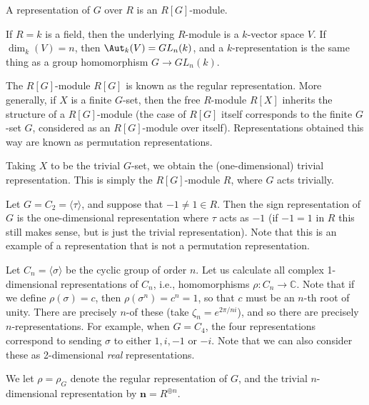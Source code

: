 \documentclass{willowtreebook}
\begin{document}
\begin{definition}
    A representation of $G$ over $R$ is an $R[G]$-module. 
\end{definition}
\begin{example}
    If $R = k$ is a field, then the underlying $R$-module is a $k$-vector space $V$. If $\dim_k(V) = n$, then $\Aut_k(V) = GL_n(k)$, and a $k$-representation is the same thing as a group homomorphism $G \to GL_n(k)$. 
\end{example}
\begin{definition}
    The $R[G]$-module $R[G]$ is known as the regular representation. More generally, if $X$ is a finite $G$-set, then the free $R$-module $R[X]$ inherits the structure of a $R[G]$-module (the case of $R[G]$ itself corresponds to the finite $G$-set $G$, considered as an $R[G]$-module over itself). Representations obtained this way are known as permutation representations. 
\end{definition}
\begin{example}
    Taking $X$ to be the trivial $G$-set, we obtain the (one-dimensional) trivial representation. This is simply the $R[G]$-module $R$, where $G$ acts trivially. 
\end{example}
\begin{definition}
    Let $G = C_2 = \langle \tau \rangle$, and suppose that $-1 \ne 1 \in R$. Then the sign representation of $G$ is the one-dimensional representation where $\tau$ acts as $-1$ (if $-1 = 1$ in $R$ this still makes sense, but is just the trivial representation). Note that this is an example of a representation that is not a permutation representation.
\end{definition}
\begin{example}
    Let $C_n = \langle \sigma \rangle$ be the cyclic group of order $n$. Let us calculate all complex 1-dimensional representations of $C_n$, i.e., homomorphisms $\rho \colon C_n \to \mathbb{C}$. Note that if we define $\rho(\sigma) =c$, then $\rho(\sigma^n) = c^n = 1$, so that $c$ must be an $n$-th root of unity. There are precisely $n$-of these (take $\zeta_n = e^{2\pi/n i}$), and so there are precisely $n$-representations. For example, when $G = C_4$, the four representations correspond to sending $\sigma$ to either $1,i,-1$ or $-i$. Note that we can also consider these as 2-dimensional \emph{real} representations. 
\end{example}
\begin{notation}
We let $\rho = \rho_G$ denote the regular representation of $G$, and the trivial $n$-dimensional representation by $\mathbf{n} = R^{\oplus n}$. 
\end{notation}
\end{document}
